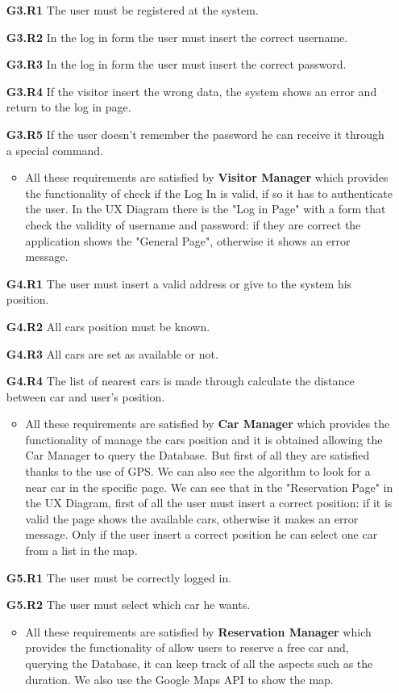 \begin{itemize}
\item[\textbf{G3.R1}] The user must be registered at the system.
\item[\textbf{G3.R2}] In the log in form the user must insert the correct username.
\item[\textbf{G3.R3}] In the log in form the user must insert the correct password.
\item[\textbf{G3.R4}] If the visitor insert the wrong data, the system shows an error and return to the log in page.
\item[\textbf{G3.R5}] If the user doesn't remember the password he can receive it through a special command.
\begin{itemize}
\item All these requirements are satisfied by \textbf{Visitor Manager} which provides the functionality of check if the Log In is valid, if so it has to authenticate the user. In the UX Diagram there is the "Log in Page" with a form that check the validity of username and password: if they are correct the application shows the "General Page", otherwise it shows an error message.
\end{itemize}

\item[\textbf{G4.R1}] The user must insert a valid address or give to the system his position.
\item[\textbf{G4.R2}] All cars position must be known.
\item[\textbf{G4.R3}] All cars are set as available or not.
\item[\textbf{G4.R4}] The list of nearest cars is made through calculate the distance between car and user's position.
\begin{itemize}
\item All these requirements are satisfied by \textbf{Car Manager} which provides the functionality of manage the cars position and it is obtained allowing the Car Manager to query the Database. But first of all they are satisfied thanks to the use of GPS. We can also see the algorithm to look for a near car in the specific page. We can see that in the "Reservation Page" in the UX Diagram, first of all the user must insert a correct position: if it is valid the page shows the available cars, otherwise it makes an error message. Only if the user insert a correct position he can select one car from a list in the map.
\end{itemize}

\item[\textbf{G5.R1}] The user must be correctly logged in.
\item[\textbf{G5.R2}] The user must select which car he wants.
\begin{itemize}
\item All these requirements are satisfied by \textbf{Reservation Manager} which provides the functionality of allow users to reserve a free car and, querying the Database, it can keep track of all the aspects such as the duration. We also use the Google Maps API to show the map.
\end{itemize}


\end{itemize}
